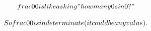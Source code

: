 






\[\\frac{0}{0} is like asking "how many 0s in 0?"\]

\[So \\frac{0}{0} is indeterminate (it could be any value).\]

